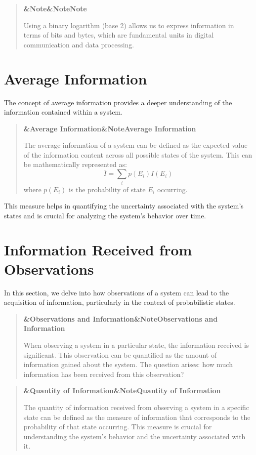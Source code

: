 \documentclass[a4paper]{article}
\newcommand{\boxheading}[1]{%
  \par\smallskip
  \noindent\textbf{\ifx&#1&Note\else#1\fi}\par
  \smallskip
}
\newenvironment{defbox}[1][]{%
  \begin{quote}\color{green!40!black}\boxheading{#1}\normalcolor
}{\end{quote}}
\newenvironment{rembox}[1][]{%
  \begin{quote}\color{black!70}\boxheading{#1}\normalcolor
}{\end{quote}}
\begin{document}
\begin{rembox}[Note]
Using a binary logarithm (base 2) allows us to express information in terms of bits and bytes, which are fundamental units in digital communication and data processing.
\end{rembox}

\section{Average Information}
The concept of average information provides a deeper understanding of the information contained within a system. 

\begin{defbox}[Average Information]
The average information of a system can be defined as the expected value of the information content across all possible states of the system. This can be mathematically represented as:
\begin{equation}
\bar{I} = \sum_{i} p(E_i) I(E_i)
\end{equation}
where \(p(E_i)\) is the probability of state \(E_i\) occurring.
\end{defbox}

This measure helps in quantifying the uncertainty associated with the system's states and is crucial for analyzing the system's behavior over time.

\section{Information Received from Observations}
In this section, we delve into how observations of a system can lead to the acquisition of information, particularly in the context of probabilistic states.

\begin{rembox}[Observations and Information]
When observing a system in a particular state, the information received is significant. This observation can be quantified as the amount of information gained about the system. The question arises: how much information has been received from this observation?
\end{rembox}

\begin{defbox}[Quantity of Information]
The quantity of information received from observing a system in a specific state can be defined as the measure of information that corresponds to the probability of that state occurring. This measure is crucial for understanding the system's behavior and the uncertainty associated with it.
\end{defbox}
\end{document}
